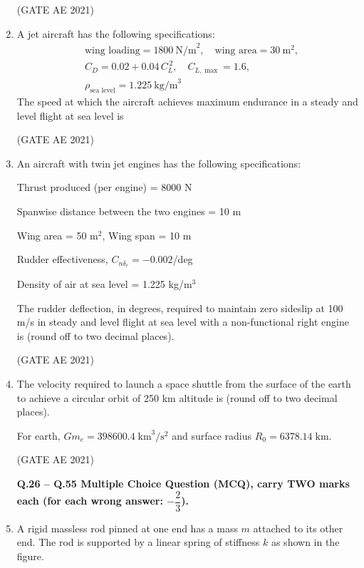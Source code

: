 \documentclass[journal,12pt,onecolumn]{IEEEtran}
\theoremstyle{remark}
\begin{document}
\begin{flushleft}
\begin{enumerate}
\hfill (GATE AE 2021)

\item 
A jet aircraft has the following specifications:
\begin{align*}
&\text{wing loading} = 1800~\text{N/m}^2, \quad \text{wing area} = 30~\text{m}^2,\\
&C_D = 0.02 + 0.04\,C_L^{\,2}, \quad C_{L,\max} = 1.6, \\
&\rho_{\text{sea level}} = 1.225~\text{kg/m}^3
\end{align*}
The speed at which the aircraft achieves maximum endurance in a steady and level flight at sea level is \underline{\hspace{2cm}}~ \; 

\hfill (GATE AE 2021)
\item An aircraft with twin jet engines has the following specifications:  

Thrust produced (per engine) = 8000 N  

Spanwise distance between the two engines = 10 m  

Wing area = 50 m$^{2}$, Wing span = 10 m  

Rudder effectiveness, $C_{n\delta_{r}} = -0.002$/deg  

Density of air at sea level = 1.225 kg/m$^{3}$  

The rudder deflection, in degrees, required to maintain zero sideslip at 100 m/s in steady and level flight at sea level with a non-functional right engine is \underline{\hspace{2cm}} (round off to two decimal places).  

\hfill(GATE AE 2021)  

\item The velocity required to launch a space shuttle from the surface of the earth to achieve a circular orbit of 250 km altitude is \underline{\hspace{2cm}} (round off to two decimal places).  

For earth, $Gm_{e} = 398600.4 \;\text{km}^{3}/\text{s}^{2}$ and surface radius $R_{0} = 6378.14 \;\text{km}$.  

\hfill(GATE AE 2021)

\textbf{Q.26 -- Q.55 Multiple Choice Question (MCQ), carry TWO marks each (for each wrong answer: $-\dfrac{2}{3}$).}

\item A rigid massless rod pinned at one end has a mass $m$ attached to its other end. The rod is supported by a linear spring of stiffness $k$ as shown in the figure.  


\end{enumerate}
\end{flushleft}
\end{document}
